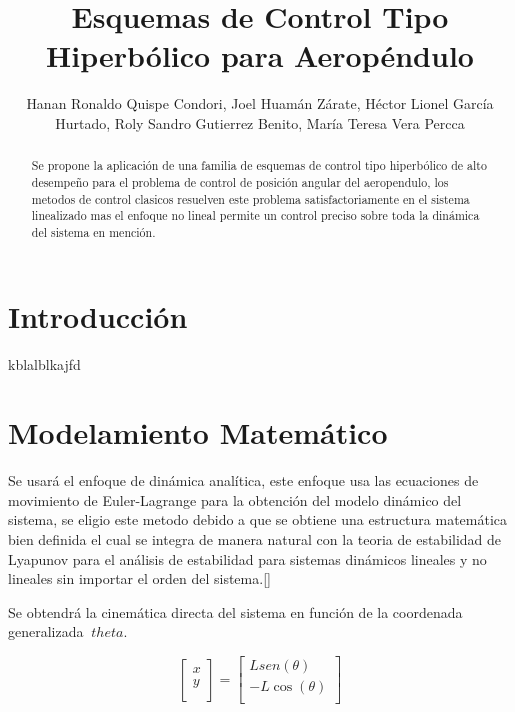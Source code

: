 \documentclass[a4paper]{IEEEtran} %
\begin{document}
\title{Esquemas de Control Tipo Hiperbólico para Aeropéndulo}
\author{Hanan Ronaldo Quispe Condori, Joel Huamán Zárate, Héctor Lionel García Hurtado, Roly Sandro Gutierrez Benito, María Teresa Vera Percca}
\maketitle
\begin{abstract}
    Se propone la aplicación de una familia de esquemas de control tipo hiperbólico de alto desempeño para el problema de control de posición angular del aeropendulo, los metodos de control clasicos resuelven este problema satisfactoriamente en el sistema linealizado mas el enfoque no lineal permite un control preciso sobre toda la dinámica del sistema en mención.
\end{abstract}
\section{Introducción}
kblalblkajfd\cite{gunnel2017tuning}
\section{Modelamiento Matemático}
\label{sec:modeling}
Se usará el enfoque de dinámica analítica, este enfoque usa las ecuaciones de movimiento de Euler-Lagrange para la obtención del modelo dinámico del sistema, se eligio este metodo debido a que se obtiene una estructura matemática bien definida el cual se integra de manera natural con la teoria de estabilidad de Lyapunov para el análisis de estabilidad para sistemas dinámicos lineales y no lineales sin importar el orden del sistema.[\cite{reyes2019drones}]

Se obtendrá la cinemática directa del sistema en función de la coordenada generalizada $\  theta$.

\begin{equation}
    \begin{bmatrix}  x \\ y \\
    \end{bmatrix}=
    \begin{bmatrix} Lsen(\theta) \\ -L\cos(\theta)  \\
    \end{bmatrix}
    \label{eq:cin_direc}
\end{equation}
\end{document}
